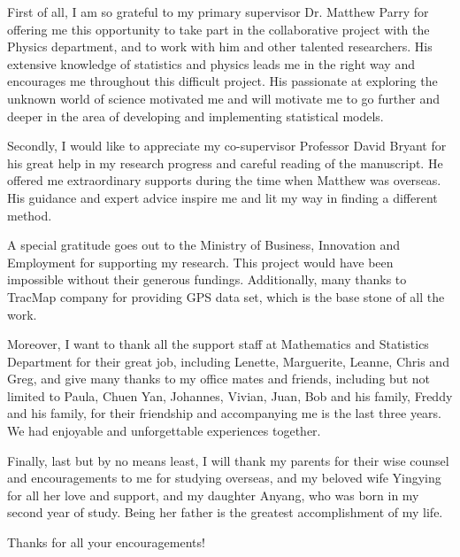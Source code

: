 First of all, I am so grateful to my primary supervisor Dr. Matthew Parry for offering me this opportunity to take part in the collaborative project with the Physics department, and to work with him and other talented researchers. His extensive knowledge of statistics and physics leads me in the right way and encourages me throughout this difficult project. His passionate at exploring the unknown world of science motivated me and will motivate me to go further and deeper in the area of developing and implementing statistical models.  

Secondly, I would like to appreciate my co-supervisor Professor David Bryant for his great help in my research progress and careful reading of the manuscript. He offered me extraordinary supports during the time when Matthew was overseas. His guidance and expert advice inspire me and lit my way in finding a different method. 

A special gratitude goes out to the Ministry of Business, Innovation and Employment for supporting my research. This project would have been impossible without their generous fundings. Additionally, many thanks to TracMap company for providing GPS data set, which is the base stone of all the work. 

Moreover, I want to thank all the support staff at Mathematics and Statistics Department for their great job, including Lenette, Marguerite, Leanne, Chris and Greg, and give many thanks to my office mates and friends, including but not limited to Paula, Chuen Yan, Johannes, Vivian, Juan, Bob and his family, Freddy and his family, for their friendship and accompanying me is the last three years. We had enjoyable and unforgettable experiences together. 

Finally, last but by no means least, I will thank my parents for their wise counsel and encouragements to me for studying overseas, and my beloved wife Yingying for all her love and support, and my daughter Anyang, who was born in my second year of study. Being her father is the greatest accomplishment of my life.

Thanks for all your encouragements! 

